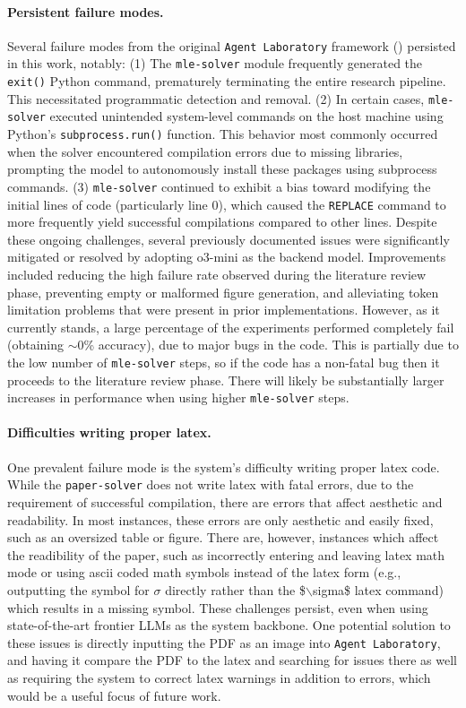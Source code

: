 \documentclass[11pt, a4paper]{include/gdm_format}
\begin{document}
\paragraph{Persistent failure modes.} Several failure modes from the original \texttt{Agent Laboratory} framework (\cite{schmidgall2025agent}) persisted in this work, notably: (1) The \texttt{mle-solver} module frequently generated the \texttt{exit()} Python command, prematurely terminating the entire research pipeline. This necessitated programmatic detection and removal. (2) In certain cases, \texttt{mle-solver} executed unintended system-level commands on the host machine using Python's \texttt{subprocess.run()} function. This behavior most commonly occurred when the solver encountered compilation errors due to missing libraries, prompting the model to autonomously install these packages using subprocess commands. (3) \texttt{mle-solver} continued to exhibit a bias toward modifying the initial lines of code (particularly line 0), which caused the \texttt{REPLACE} command to more frequently yield successful compilations compared to other lines. Despite these ongoing challenges, several previously documented issues were significantly mitigated or resolved by adopting o3-mini as the backend model. Improvements included reducing the high failure rate observed during the literature review phase, preventing empty or malformed figure generation, and alleviating token limitation problems that were present in prior implementations. However, as it currently stands, a large percentage of the experiments performed completely fail (obtaining $\sim0$\% accuracy), due to major bugs in the code. This is partially due to the low number of \texttt{mle-solver} steps, so if the code has a non-fatal bug then it proceeds to the literature review phase. There will likely be substantially larger increases in performance when using higher \texttt{mle-solver} steps.

\paragraph{Difficulties writing proper latex.} One prevalent failure mode is the system's difficulty writing proper latex code. While the \texttt{paper-solver} does not write latex with fatal errors, due to the requirement of successful compilation, there are errors that affect aesthetic and readability. In most instances, these errors are only aesthetic and easily fixed, such as an oversized table or figure. There are, however, instances which affect the readibility of the paper, such as incorrectly entering and leaving latex math mode or using ascii coded math symbols instead of the latex form (e.g., outputting the symbol for $\sigma$ directly rather than the \$$\backslash$sigma\$ latex command) which results in a missing symbol. These challenges persist, even when using state-of-the-art frontier LLMs as the system backbone. One potential solution to these issues is directly inputting the PDF as an image into \texttt{Agent Laboratory}, and having it compare the PDF to the latex and searching for issues there as well as requiring the system to correct latex warnings in addition to errors, which would be a useful focus of future work.
\end{document}
